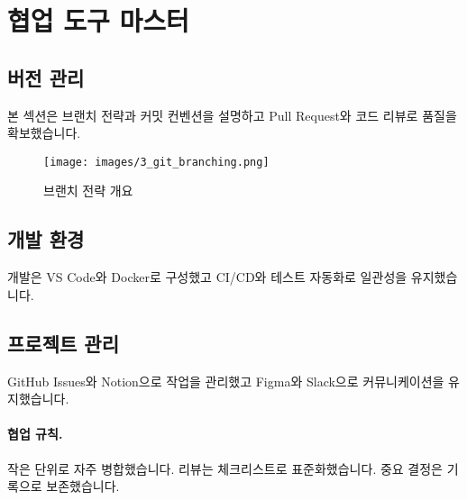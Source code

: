 \section{협업 도구 마스터}

\subsection{버전 관리}
본 섹션은 브랜치 전략과 커밋 컨벤션을 설명하고 Pull Request와 코드 리뷰로 품질을 확보했습니다.

\begin{figure}[H]
    \centering
    \texttt{[image: images/3\_git\_branching.png]}
    \caption{브랜치 전략 개요}
    \label{fig:git_branch}
\end{figure}

\subsection{개발 환경}
개발은 VS Code와 Docker로 구성했고 CI/CD와 테스트 자동화로 일관성을 유지했습니다.

\subsection{프로젝트 관리}
GitHub Issues와 Notion으로 작업을 관리했고 Figma와 Slack으로 커뮤니케이션을 유지했습니다.

\paragraph{협업 규칙.} 작은 단위로 자주 병합했습니다. 리뷰는 체크리스트로 표준화했습니다. 중요 결정은 기록으로 보존했습니다.

